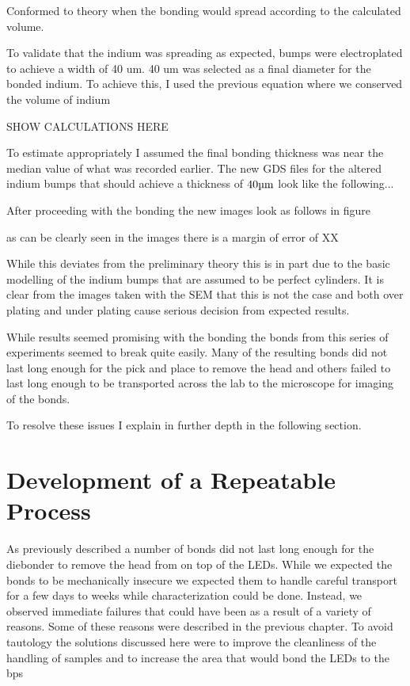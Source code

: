 Conformed to theory when the bonding would spread according to the calculated volume.

To validate that the indium was spreading as expected, bumps were electroplated to achieve a width of 40 um. 40 um was selected as a final diameter for the bonded indium. To achieve this, I used the previous equation where we conserved the volume of indium %

SHOW CALCULATIONS HERE

To estimate appropriately I assumed the final bonding thickness was near the median value of what was recorded earlier. The new GDS files for the altered indium bumps that should achieve a thickness of $40 \um$ look like the following...

After proceeding with the bonding the new images look as follows in figure


as can be clearly seen in the images there is a margin of error of XX%

While this deviates from the preliminary theory this is in part due to the basic modelling of the indium bumps that are assumed to be perfect cylinders. It is clear from the images taken with the SEM that this is not the case and both over plating and under plating cause serious decision from expected results.

While results seemed promising with the bonding the bonds from this series of experiments seemed to break quite easily. Many of the resulting bonds did not last long enough for the pick and place to remove the head and others failed to last long enough to be transported across the lab to the microscope for imaging of the bonds.

To resolve these issues I explain in further depth in the following section.


\section{Development of a Repeatable Process}

As previously described a number of bonds did not last long enough for the diebonder to remove the head from on top of the LEDs. While we expected the bonds to be mechanically insecure we expected them to handle careful transport for a few days to weeks while characterization could be done. Instead, we observed immediate failures that could have been as a result of a variety of reasons. Some of these reasons were described in the previous chapter. To avoid tautology the solutions discussed here were to improve the cleanliness of the handling of samples and to increase the area that would bond the LEDs to the bps

